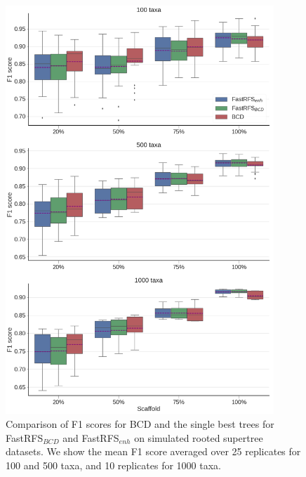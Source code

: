 \begin{figure}
  \centering
  \includegraphics[width=0.9\textwidth]{siesta-supp-figs/fastrfs_nosiesta_smidgenOG_f1}
  \caption[Comparison of F1 scores for  BCD and the single best trees for FastRFS$_{BCD}$ and FastRFS$_{enh}$ on simulated
    rooted supertree datasets.]{Comparison of F1 scores for  BCD and the single best trees for FastRFS$_{BCD}$ and FastRFS$_{enh}$ on simulated
    rooted supertree datasets. We show the mean F1 score
    averaged over 25 replicates for 100 and 500 taxa, and 10
    replicates for 1000 taxa.}
  \label{fig:supertree-consensus-comparison-7}
\end{figure}




